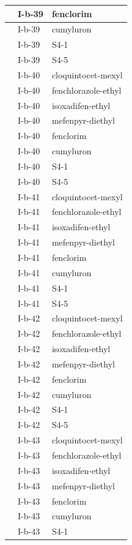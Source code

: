 \documentclass[11pt,a4paper]{article}
\begin{document}
\begin{table}[h]
\begin{tabular}{|l|l|l|}
 & I-b-39 & fenclorim \\ \hline
 & I-b-39 & cumyluron \\ \hline
 & I-b-39 & S4-1 \\ \hline
 & I-b-39 & S4-5 \\ \hline
 & I-b-40 & cloquintocet-mexyl \\ \hline
 & I-b-40 & fenchlorazole-ethyl \\ \hline
 & I-b-40 & isoxadifen-ethyl \\ \hline
 & I-b-40 & mefenpyr-diethyl \\ \hline
 & I-b-40 & fenclorim \\ \hline
 & I-b-40 & cumyluron \\ \hline
 & I-b-40 & S4-1 \\ \hline
 & I-b-40 & S4-5 \\ \hline
 & I-b-41 & cloquintocet-mexyl \\ \hline
 & I-b-41 & fenchlorazole-ethyl \\ \hline
 & I-b-41 & isoxadifen-ethyl \\ \hline
 & I-b-41 & mefenpyr-diethyl \\ \hline
 & I-b-41 & fenclorim \\ \hline
 & I-b-41 & cumyluron \\ \hline
 & I-b-41 & S4-1 \\ \hline
 & I-b-41 & S4-5 \\ \hline
 & I-b-42 & cloquintocet-mexyl \\ \hline
 & I-b-42 & fenchlorazole-ethyl \\ \hline
 & I-b-42 & isoxadifen-ethyl \\ \hline
 & I-b-42 & mefenpyr-diethyl \\ \hline
 & I-b-42 & fenclorim \\ \hline
 & I-b-42 & cumyluron \\ \hline
 & I-b-42 & S4-1 \\ \hline
 & I-b-42 & S4-5 \\ \hline
 & I-b-43 & cloquintocet-mexyl \\ \hline
 & I-b-43 & fenchlorazole-ethyl \\ \hline
 & I-b-43 & isoxadifen-ethyl \\ \hline
 & I-b-43 & mefenpyr-diethyl \\ \hline
 & I-b-43 & fenclorim \\ \hline
 & I-b-43 & cumyluron \\ \hline
 & I-b-43 & S4-1 \\ \hline

\end{tabular}
\end{table}
\end{document}

